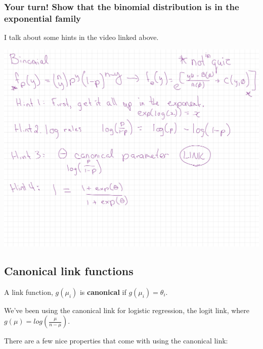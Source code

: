 \documentclass[
  openany]{book}
\begin{document}
\hypertarget{your-turn-show-that-the-binomial-distribution-is-in-the-exponential-family}{%
\subsubsection{Your turn! Show that the binomial distribution is in the exponential family}\label{your-turn-show-that-the-binomial-distribution-is-in-the-exponential-family}}

I talk about some hints in the video linked above.

\begin{center}\includegraphics[width=1\linewidth]{images/m4/binomial-hints} \end{center}

\hypertarget{canonical-link-functions}{%
\subsection{Canonical link functions}\label{canonical-link-functions}}

A link function, \(g(\mu_i)\) is \textbf{canonical} if \(g(\mu_i) = \theta_i\).

We've been using the canonical link for logistic regression, the logit
link, where \(g(\mu) = log(\frac{\mu}{n-\mu})\).

There are a few nice properties that come with using the canonical link:
\end{document}

